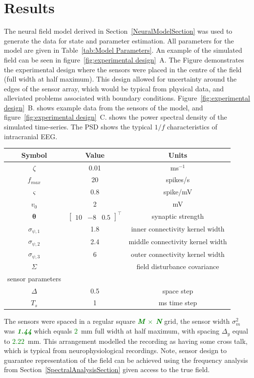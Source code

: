 \documentclass[12pt]{iopart}
\newcommand{\omg}[1]{\textsf{\emph{\textbf{\textcolor{green}{#1}}}}}
\begin{document}
\section{Results}\label{ResultsSection} The neural field model derived in Section~\ref{NeuralModelSection} was used to generate the data for state and parameter estimation. All parameters for the model are given in Table~\ref{tab:Model Parameters}. An example of the simulated field can be seen in figure~\ref{fig:experimental design}~A. The Figure demonstrates the experimental design where the sensors were placed in the centre of the field (full width at half maximum). This design allowed for uncertainty around the edges of the sensor array, which would be typical from physical data, and alleviated problems associated with boundary conditions. Figure~\ref{fig:experimental design}~B. shows example data from the sensors of the model, and figure~\ref{fig:experimental design}~C. shows the power spectral density of the simulated time-series. The PSD shows the typical $1/f$ characteristics of intracranial EEG.
\begin{center}
\begin{tabular}{c|c|c}	
	\hline\hline Symbol & Value & Units \\
	\hline\hline
	$\zeta$ & 0.01 & ms$^{-1}$\\
	$f_{max}$ & 20 & spikes/s \\
	$\varsigma$ & 0.8 & spike/mV\\
	$v_0$ & 2 & mV\\
	$\boldsymbol{\theta}$ & $\left[\begin{array}{ccc}
	10 &-8 &0.5
	\end{array}
	\right]^{\top}$ & synaptic strength\\
	$\sigma_{\psi,1}$ & 1.8 & inner connectivity kernel width\\
	$\sigma_{\psi,2}$ & 2.4 & middle connectivity kernel width\\
	$\sigma_{\psi,3}$ & 6 & outer connectivity kernel width\\
	$\Sigma$ & & field disturbance covariance \\
	sensor parameters & & \\
	$\Delta$ & 0.5 & space step \\
	$T_s$ & 1 & ms time step \\ 
	\hline\hline
\end{tabular}\label{tab:Model Parameters}
\end{center}
The sensors were spaced in a regular square \omg{M $\times$ N} grid, the sensor width $\sigma^2_m$ was \omg{1.44} which equals \omg{$2$}~mm full width at half maximum, with spacing $\Delta_y$ equal to \omg{$2.22$}~mm. This arrangement modelled the recording as having some cross talk, which is typical from neurophysiological recordings. Note, sensor design to guarantee representation of the field can be achieved using the frequency analysis from Section~\ref{SpectralAnalysisSection} given access to the true field. 
\end{document}

